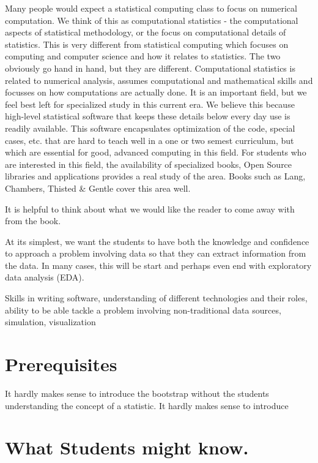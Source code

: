 Many people would expect a statistical computing class to focus on
numerical computation.  We think of this as computational statistics -
the computational aspects of statistical methodology, or the focus on
computational details of statistics.  This is very different from
statistical computing which focuses on computing and computer science
and how it relates to statistics.  The two obviously go hand in hand,
but they are different.  Computational statistics is related to
numerical analysis, assumes computational and mathematical skills and
focusses on how computations are actually done.  It is an important
field, but we feel best left for specialized study in this current
era.  We believe this because high-level statistical software that
keeps these details below every day use is readily available. This
software encapsulates optimization of the code, special cases, etc.
that are hard to teach well in a one or two semest curriculum, but
which are essential for good, advanced computing in this field.  For
students who are interested in this field, the availability of
specialized books, Open Source libraries and applications provides a
real study of the area.  Books such as Lang, Chambers, Thisted \& Gentle
cover this area well.


It is helpful to think about what we would like the reader to come
away with from the book.

At its simplest, we want the students to have both the knowledge and
confidence to approach a problem involving data so that they can
extract information from the data.  In many cases, this will be start
and perhaps even end with exploratory data analysis (EDA).

Skills in writing software,
understanding of different technologies and their roles,
ability to be able tackle a problem involving
non-traditional data sources, 
simulation,
visualization 



\section{Prerequisites}
It hardly makes sense to introduce the bootstrap
without the students understanding the concept of
a statistic.
It hardly makes sense to introduce 


\section{What Students might know.}

